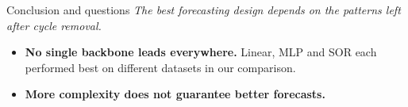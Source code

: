 \documentclass[aspectratio=169]{beamer}
\begin{document}
\begin{frame}{Conclusion and questions}
\normalsize
\textit{The best forecasting design depends on the patterns left after cycle removal.}\par
\vspace{1.0em}
\begin{itemize}
  \setlength{\itemsep}{0.85em}
  \item \textbf{No single backbone leads everywhere.} Linear, MLP and SOR each performed best on different datasets in our comparison.
  \item \textbf{More complexity does not guarantee better forecasts.}
\end{itemize}
\vspace{1.1em}
{\setlength{\fboxsep}{9pt}\setlength{\fboxrule}{0.45pt}%
\noindent\color{black}}
\end{frame}
\end{document}
